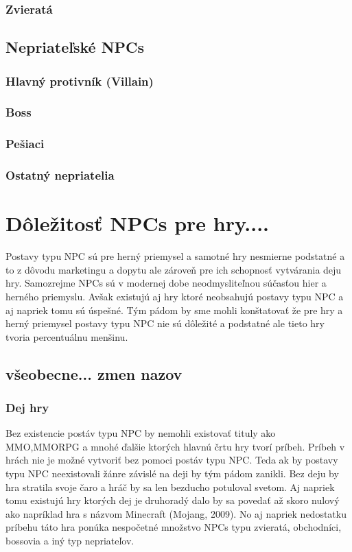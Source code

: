 \documentclass[10pt,twoside,slovak,a4paper]{article}
\begin{document}
\subsubsection{Zvieratá}

\subsection{Nepriateľské NPCs} \label{enemy}

\subsubsection{Hlavný protivník (Villain)} \label{BOSS}

\subsubsection{Boss} \label{BOSS}

\subsubsection{Pešiaci} \label{Pesiaci}

\subsubsection{Ostatný nepriatelia} \label{Pesiaci}


\section{Dôležitosť NPCs pre hry....}   \label{Dolezitost}

Postavy typu NPC sú pre herný priemysel a samotné hry nesmierne podstatné a to z dôvodu marketingu a dopytu ale zároveň pre ich schopnosť vytvárania deju hry. Samozrejme NPCs sú v modernej dobe neodmysliteľnou súčasťou hier a herného priemyslu. Avšak existujú aj hry ktoré neobsahujú postavy typu NPC a aj napriek tomu sú úspešné. Tým pádom by sme mohli konštatovať že pre hry a herný priemysel postavy typu NPC nie sú dôležité a podstatné ale tieto hry tvoria percentuálnu menšinu.%

\subsection{všeobecne... zmen nazov}

\subsubsection{Dej hry}
Bez existencie postáv typu NPC by nemohli existovať tituly ako MMO,MMORPG a mnohé ďalšie ktorých hlavnú črtu hry tvorí príbeh. Príbeh v hrách nie je možné vytvoriť bez pomoci postáv typu NPC. Teda ak by postavy typu NPC neexistovali žánre závislé na deji by tým pádom zanikli. Bez deju by hra stratila svoje čaro a hráč by sa len bezducho potuloval svetom. Aj napriek tomu existujú hry ktorých dej je druhoradý dalo by sa povedať až skoro nulový ako napríklad hra s názvom Minecraft (Mojang, 2009). No aj napriek nedostatku príbehu táto hra ponúka nespočetné množstvo NPCs typu zvieratá, obchodníci, bossovia a iný typ nepriateľov.
\end{document}
